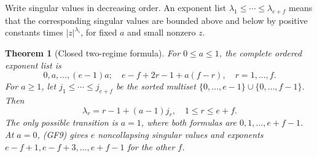 \documentclass[11pt]{article}
\newtheorem{theorem}{Theorem}
\begin{document}
Write singular values in decreasing order. An exponent list
$\lambda_1\le\cdots\le\lambda_{e+f}$ means that the corresponding
singular values are bounded above and below by positive constants
times $|z|^{\lambda_i}$, for fixed $a$ and small nonzero $z$.

\begin{theorem}[Closed two-regime formula]
For $0\le a\le1$, the complete ordered exponent list is
\[
\boxed{\ 0,a,\ldots,(e-1)a;\quad
e-f+2r-1+a(f-r),\quad r=1,\ldots,f.\ }
\tag{GF9}
\]
For $a\ge1$, let $j_1\le\cdots\le j_{e+f}$ be the sorted multiset
$\{0,\ldots,e-1\}\cup\{0,\ldots,f-1\}$. Then
\[
\boxed{\lambda_r=r-1+(a-1)j_r,\quad 1\le r\le e+f.}
\tag{GF10}
\]
The only possible transition is $a=1$, where both formulas are
$0,1,\ldots,e+f-1$. At $a=0$, (GF9) gives $e$ noncollapsing singular
values and exponents $e-f+1,e-f+3,\ldots,e+f-1$ for the other $f$.
\end{theorem}
\end{document}
